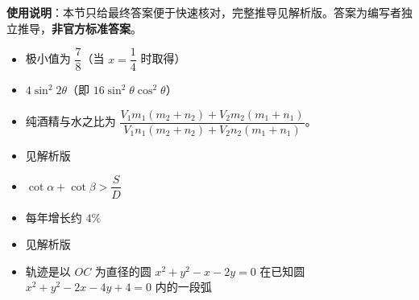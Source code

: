 
\begin{gknotice}
\textbf{使用说明}：本节只给最终答案便于快速核对，完整推导见解析版。答案为编写者独立推导，\textbf{非官方标准答案}。
\end{gknotice}

\begin{itemize}[leftmargin=2.6em]
  \item[\textbf{1.}] 极小值为 $\dfrac78$（当 $x=\dfrac14$ 时取得）
  \item[\textbf{2.}] $4\sin^2 2\theta$（即 $16\sin^2\theta\cos^2\theta$）
  \item[\textbf{3.}] 纯酒精与水之比为 $\dfrac{V_1m_1(m_2+n_2)+V_2m_2(m_1+n_1)}{V_1n_1(m_2+n_2)+V_2n_2(m_1+n_1)}$。
  \item[\textbf{4.}] 见解析版
  \item[\textbf{5.}] $\cot\alpha+\cot\beta>\dfrac SD$
  \item[\textbf{6.}] 每年增长约 $4\%$
  \item[\textbf{7.}] 见解析版
  \item[\textbf{8.}] 轨迹是以 $OC$ 为直径的圆 $x^2+y^2-x-2y=0$ 在已知圆 $x^2+y^2-2x-4y+4=0$ 内的一段弧
\end{itemize}
